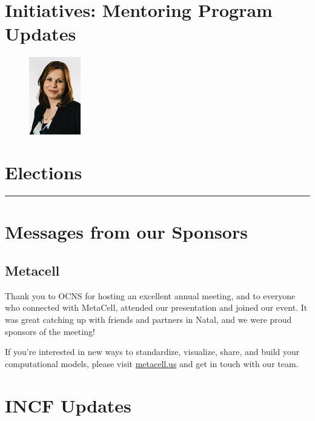 \documentclass[11pt,a4paper,oneside]{article}
\begin{document}
\clearpage
\section*{Initiatives: Mentoring Program Updates}%
\begin{figure}
  \includegraphics[width=0.2\textwidth]{images/Mavritsaki}
\end{figure}

\lipsum[1-3]

\clearpage
\section*{Elections}%
\rule{\textwidth}{0.4pt}
\lipsum[1-3]

\clearpage

\clearpage

\clearpage
\section*{Messages from our Sponsors}%
\subsection*{Metacell}%
\begin{displayquote}
  Thank you to OCNS for hosting an excellent annual meeting, and to everyone who connected with MetaCell, attended our presentation and joined our event.
  It was great catching up with friends and partners in Natal, and we were proud sponsors of the meeting!

  If you're interested in new ways to standardize, visualize, share, and build your computational models, please visit \url{metacell.us} and get in touch with our team.
\end{displayquote}

\clearpage
\section*{INCF Updates}%
\lipsum[1-3]
\end{document}
